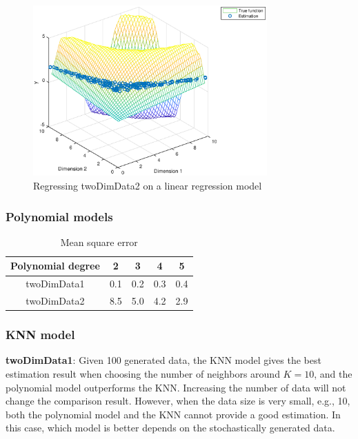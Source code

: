 \documentclass[]{article}
\begin{document}
\begin{figure}[H]
	\caption{Regressing twoDimData2 on a linear regression model}
	\label{fig:twodimData2}
	\centering
	\includegraphics[width=0.8\textwidth]{project41c2}
\end{figure}

\subsubsection{Polynomial models}
\begin{table}[H]
	\centering
	\caption{Mean square error}
	\label{tab:twodimData}
	\begin{tabular}{@{}ccccc@{}}
		\toprule
		Polynomial degree & 2   & 3   & 4   & 5   \\ \midrule
		twoDimData1       & 0.1 & 0.2 & 0.3 & 0.4 \\
		twoDimData2       & 8.5 & 5.0 & 4.2 & 2.9 \\ \bottomrule
	\end{tabular}
\end{table}

\subsubsection{KNN model}

\textbf{twoDimData1}: Given 100 generated data, the KNN model gives the best estimation result when choosing the number of neighbors around $K=10$, and the polynomial model outperforms the KNN. Increasing the number of data will not change the comparison result. However, when the data size is very small, e.g., 10, both the polynomial model and the KNN cannot provide a good estimation. In this case, which model is better depends on the stochastically generated data.
\end{document}
